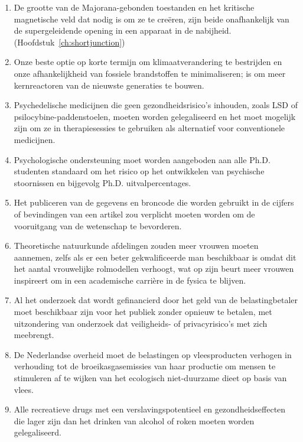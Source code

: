 \documentclass{dissertation}
\begin{document}
{\begin{enumerate}
\item De grootte van de Majorana-gebonden toestanden en het kritische magnetische veld dat nodig is om ze te creëren, zijn beide onafhankelijk van de supergeleidende opening in een apparaat in de nabijheid. (Hoofdstuk~\ref{ch:shortjunction})

\item Onze beste optie op korte termijn om klimaatverandering te bestrijden en onze afhankelijkheid van fossiele brandstoffen te minimaliseren; is om meer kernreactoren van de nieuwste generaties te bouwen.

\item Psychedelische medicijnen die geen gezondheidsrisico's inhouden, zoals LSD of psilocybine-paddenstoelen, moeten worden gelegaliseerd en het moet mogelijk zijn om ze in therapiesessies te gebruiken als alternatief voor conventionele medicijnen.

\item Psychologische ondersteuning moet worden aangeboden aan alle Ph.D. studenten standaard om het risico op het ontwikkelen van psychische stoornissen en bijgevolg Ph.D. uitvalpercentages.

\item Het publiceren van de gegevens en broncode die worden gebruikt in de cijfers of bevindingen van een artikel zou verplicht moeten worden om de vooruitgang van de wetenschap te bevorderen.

\item Theoretische natuurkunde afdelingen zouden meer vrouwen moeten aannemen, zelfs als er een beter gekwalificeerde man beschikbaar is omdat dit het aantal vrouwelijke rolmodellen verhoogt, wat op zijn beurt meer vrouwen inspireert om in een academische carrière in de fysica te blijven.

\item Al het onderzoek dat wordt gefinancierd door het geld van de belastingbetaler moet beschikbaar zijn voor het publiek zonder opnieuw te betalen, met uitzondering van onderzoek dat veiligheids- of privacyrisico's met zich meebrengt.

\item De Nederlandse overheid moet de belastingen op vleesproducten verhogen in verhouding tot de broeikasgasemissies van haar productie om mensen te stimuleren af te wijken van het ecologisch niet-duurzame dieet op basis van vlees.

\item Alle recreatieve drugs met een verslavingspotentieel en gezondheidseffecten die lager zijn dan het drinken van alcohol of roken moeten worden gelegaliseerd.


\end{enumerate}}
\end{document}
